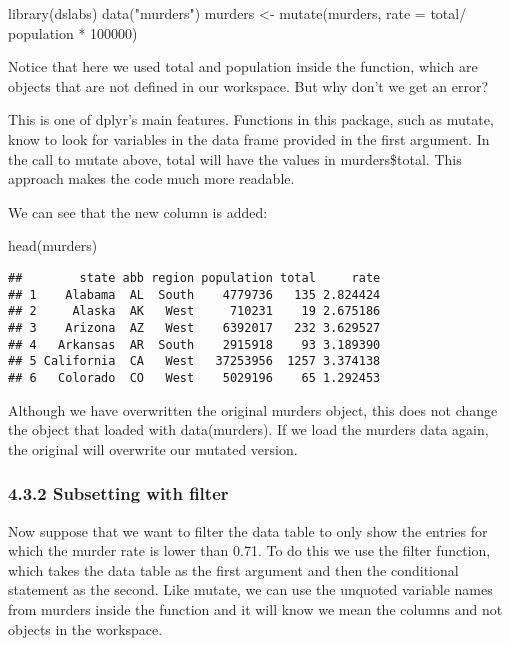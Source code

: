 \documentclass[
]{article}
\newenvironment{Shaded}{\begin{snugshade}}{\end{snugshade}}
\newcommand{\AttributeTok}[1]{\textcolor[rgb]{0.77,0.63,0.00}{#1}}
\newcommand{\DecValTok}[1]{\textcolor[rgb]{0.00,0.00,0.81}{#1}}
\newcommand{\FunctionTok}[1]{\textcolor[rgb]{0.00,0.00,0.00}{#1}}
\newcommand{\NormalTok}[1]{#1}
\newcommand{\OtherTok}[1]{\textcolor[rgb]{0.56,0.35,0.01}{#1}}
\newcommand{\SpecialCharTok}[1]{\textcolor[rgb]{0.00,0.00,0.00}{#1}}
\newcommand{\StringTok}[1]{\textcolor[rgb]{0.31,0.60,0.02}{#1}}
\begin{document}
\begin{Shaded}
\begin{Highlighting}[]
\FunctionTok{library}\NormalTok{(dslabs)}
\FunctionTok{data}\NormalTok{(}\StringTok{"murders"}\NormalTok{)}
\NormalTok{murders }\OtherTok{\textless{}{-}} \FunctionTok{mutate}\NormalTok{(murders, }\AttributeTok{rate =}\NormalTok{ total}\SpecialCharTok{/}\NormalTok{ population }\SpecialCharTok{*} \DecValTok{100000}\NormalTok{)}
\end{Highlighting}
\end{Shaded}

Notice that here we used total and population inside the function, which
are objects that are not defined in our workspace. But why don't we get
an error?

This is one of dplyr's main features. Functions in this package, such as
mutate, know to look for variables in the data frame provided in the
first argument. In the call to mutate above, total will have the values
in murders\$total. This approach makes the code much more readable.

We can see that the new column is added:

\begin{Shaded}
\begin{Highlighting}[]
\FunctionTok{head}\NormalTok{(murders)}
\end{Highlighting}
\end{Shaded}

\begin{verbatim}
##        state abb region population total     rate
## 1    Alabama  AL  South    4779736   135 2.824424
## 2     Alaska  AK   West     710231    19 2.675186
## 3    Arizona  AZ   West    6392017   232 3.629527
## 4   Arkansas  AR  South    2915918    93 3.189390
## 5 California  CA   West   37253956  1257 3.374138
## 6   Colorado  CO   West    5029196    65 1.292453
\end{verbatim}

Although we have overwritten the original murders object, this does not
change the object that loaded with data(murders). If we load the murders
data again, the original will overwrite our mutated version.

\hypertarget{subsetting-with-filter}{%
\subsubsection{4.3.2 Subsetting with
filter}\label{subsetting-with-filter}}

Now suppose that we want to filter the data table to only show the
entries for which the murder rate is lower than 0.71. To do this we use
the filter function, which takes the data table as the first argument
and then the conditional statement as the second. Like mutate, we can
use the unquoted variable names from murders inside the function and it
will know we mean the columns and not objects in the workspace.
\end{document}
